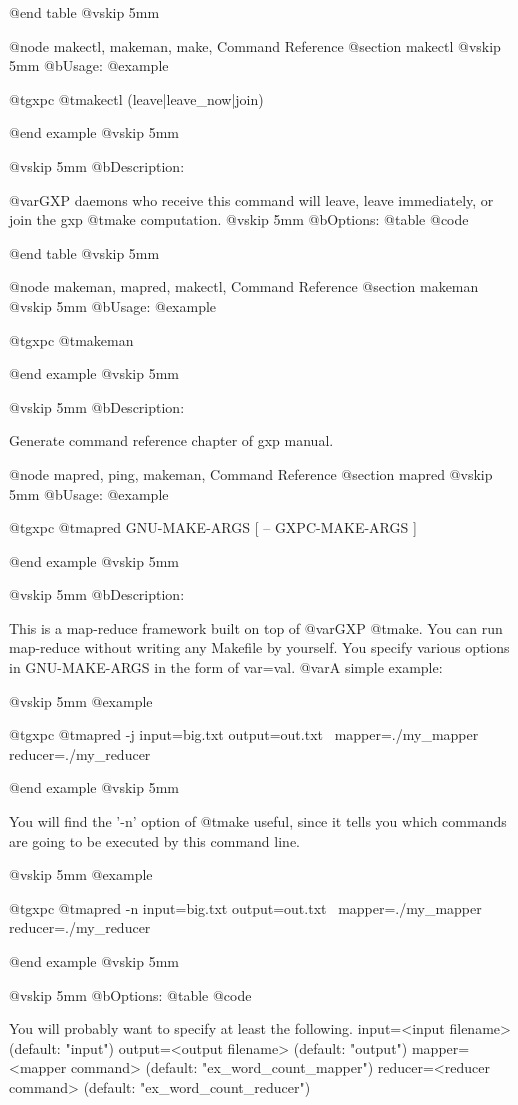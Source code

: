 @end table
@vskip 5mm

@node makectl, makeman, make, Command Reference
@section makectl
@vskip 5mm
@b{Usage:}
@example

  @t{gxpc} @t{makectl} (leave|leave_now|join)

@end example
@vskip 5mm

@vskip 5mm
@b{Description:}


  @var{GXP} daemons who receive this command will leave, leave immediately,
or join the gxp @t{make} computation.
@vskip 5mm
@b{Options:}
@table @code


@end table
@vskip 5mm

@node makeman, mapred, makectl, Command Reference
@section makeman
@vskip 5mm
@b{Usage:}
@example

  @t{gxpc} @t{makeman}

@end example
@vskip 5mm

@vskip 5mm
@b{Description:}


  Generate command reference chapter of gxp manual.

@node mapred, ping, makeman, Command Reference
@section mapred
@vskip 5mm
@b{Usage:}
@example

  @t{gxpc} @t{mapred} GNU-MAKE-ARGS [ -- GXPC-MAKE-ARGS ]

@end example
@vskip 5mm

@vskip 5mm
@b{Description:}


  This is a map-reduce framework built on top of @var{GXP} @t{make}.
You can run map-reduce without writing any Makefile by yourself.
You specify various options in GNU-MAKE-ARGS in the form of 
var=val.  @var{A} simple example:

@vskip 5mm
@example

  @t{gxpc} @t{mapred} -j input=big.txt output=out.txt \
    mapper=./my_mapper reducer=./my_reducer

@end example
@vskip 5mm

You will find the '-n' option of @t{make} useful, since it tells you
which commands are going to be executed by this command line.

@vskip 5mm
@example

  @t{gxpc} @t{mapred} -n input=big.txt output=out.txt \
    mapper=./my_mapper reducer=./my_reducer

@end example
@vskip 5mm

@vskip 5mm
@b{Options:}
@table @code

You will probably want to specify at least the following.
  input=<input filename>     (default: "input")
  output=<output filename>   (default: "output")
  mapper=<mapper command>    (default: "ex_word_count_mapper")
  reducer=<reducer command>  (default: "ex_word_count_reducer")

